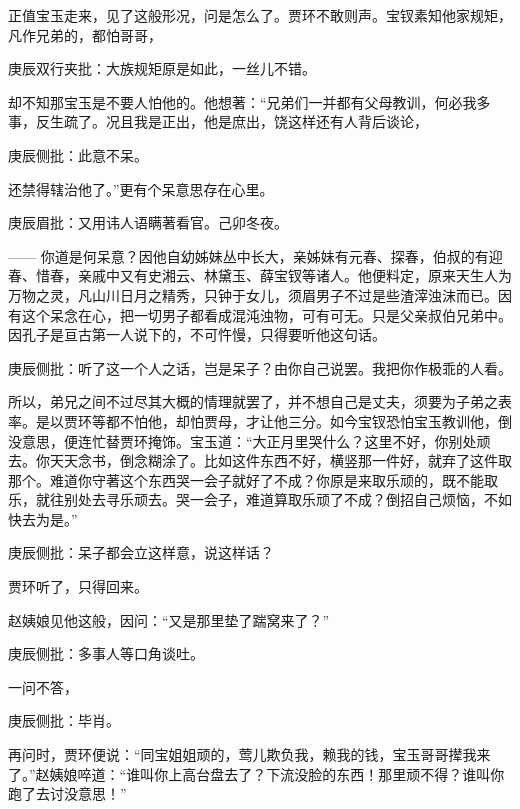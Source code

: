 \begin{parag}


    正值宝玉走来，见了这般形况，问是怎么了。贾环不敢则声。宝钗素知他家规矩，凡作兄弟的，都怕哥哥，\begin{note}庚辰双行夹批：大族规矩原是如此，一丝儿不错。\end{note}却不知那宝玉是不要人怕他的。他想著：“兄弟们一并都有父母教训，何必我多事，反生疏了。况且我是正出，他是庶出，饶这样还有人背后谈论，\begin{note}庚辰侧批：此意不呆。\end{note}还禁得辖治他了。”更有个呆意思存在心里。\begin{note}庚辰眉批：又用讳人语瞒著看官。己卯冬夜。\end{note}—— 你道是何呆意？因他自幼姊妹丛中长大，亲姊妹有元春、探春，伯叔的有迎春、惜春，亲戚中又有史湘云、林黛玉、薛宝钗等诸人。他便料定，原来天生人为万物之灵，凡山川日月之精秀，只钟于女儿，须眉男子不过是些渣滓浊沫而已。因有这个呆念在心，把一切男子都看成混沌浊物，可有可无。只是父亲叔伯兄弟中。因孔子是亘古第一人说下的，不可忤慢，只得要听他这句话。\begin{note}庚辰侧批：听了这一个人之话，岂是呆子？由你自己说罢。我把你作极乖的人看。\end{note}所以，弟兄之间不过尽其大概的情理就罢了，并不想自己是丈夫，须要为子弟之表率。是以贾环等都不怕他，却怕贾母，才让他三分。如今宝钗恐怕宝玉教训他，倒没意思，便连忙替贾环掩饰。宝玉道：“大正月里哭什么？这里不好，你别处顽去。你天天念书，倒念糊涂了。比如这件东西不好，横竖那一件好，就弃了这件取那个。难道你守著这个东西哭一会子就好了不成？你原是来取乐顽的，既不能取乐，就往别处去寻乐顽去。哭一会子，难道算取乐顽了不成？倒招自己烦恼，不如快去为是。”\begin{note}庚辰侧批：呆子都会立这样意，说这样话？\end{note}贾环听了，只得回来。
\end{parag}


\begin{parag}


    赵姨娘见他这般，因问：“又是那里垫了踹窝来了？”\begin{note}庚辰侧批：多事人等口角谈吐。\end{note}一问不答，\begin{note}庚辰侧批：毕肖。\end{note}再问时，贾环便说：“同宝姐姐顽的，莺儿欺负我，赖我的钱，宝玉哥哥撵我来了。”赵姨娘啐道：“谁叫你上高台盘去了？下流没脸的东西！那里顽不得？谁叫你跑了去讨没意思！”
\end{parag}


